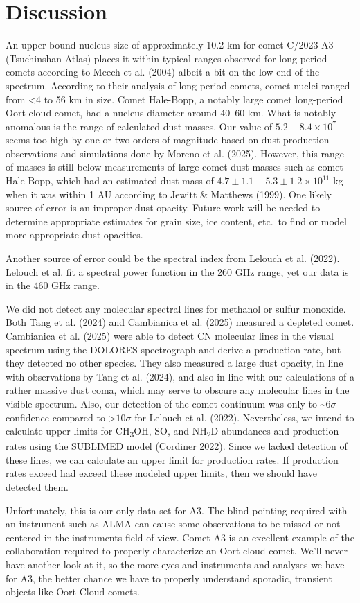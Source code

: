 \section{Discussion}\label{discussion}

An upper bound nucleus size of approximately 10.2 km for comet C/2023 A3 (Tsuchinshan-Atlas) places it within typical ranges observed for
long-period comets according to Meech et al. (2004) albeit a bit on the low end of the spectrum. According to their analysis of long-period comets, comet nuclei ranged from \textless{4} to 56 km in size. Comet Hale-Bopp, a notably large comet long-period Oort cloud comet, had a nucleus diameter around 40--60 km. What is notably anomalous is the range of calculated dust masses. Our value of
\(5.2 - 8.4 \times 10^{7}\) seems too high by one or two orders of magnitude based on dust production observations and simulations done by
Moreno et al. (2025). However, this range of masses is still below measurements of large comet dust masses such as comet Hale-Bopp, which
had an estimated dust mass of \(4.7 \pm 1.1 - 5.3 \pm 1.2 \times 10^{11}\) kg when it was within 1 AU according to Jewitt \& Matthews (1999). One likely source of error is an improper dust opacity. Future work will be needed to determine appropriate estimates for grain size, ice content, etc.\ to find or model more appropriate dust opacities.

Another source of error could be the spectral index from Lelouch et al. (2022). Lelouch et al. fit a spectral power function in the 260 GHz range, yet our data is in the 460 GHz range.

We did not detect any molecular spectral lines for methanol or sulfur monoxide. Both Tang et al. (2024) and Cambianica et al. (2025) measured a depleted comet. Cambianica et al. (2025) were able to detect CN molecular lines in the visual spectrum using the DOLORES spectrograph and derive a production rate, but they detected no other species. They also measured a large dust opacity, in line with observations by Tang et al. (2024), and also in line with our calculations of a rather massive dust coma, which may serve to obscure any molecular lines in the visible spectrum. Also, our detection of the comet continuum was only to \textasciitilde{}\(6\sigma\) confidence compared to \textgreater\(10\sigma\) for Lelouch et al. (2022). Nevertheless, we intend to calculate upper limits for CH\textsubscript{3}OH, SO, and NH\textsubscript{2}D abundances and production rates using the SUBLIMED model (Cordiner 2022). Since we lacked detection of these lines, we can calculate an upper limit for production rates. If production rates exceed had exceed these modeled upper limits, then we should have detected them.

Unfortunately, this is our only data set for A3. The blind pointing required with an instrument such as ALMA can cause some observations to be missed or not centered in the instruments field of view. Comet A3 is an excellent example of the collaboration required to properly
characterize an Oort cloud comet. We'll never have another look at it, so the more eyes and instruments and analyses we have for A3, the better chance we have to properly understand sporadic, transient objects like Oort Cloud comets.
